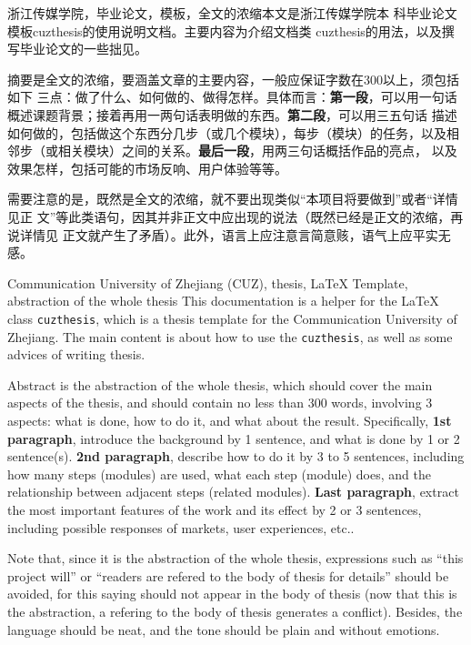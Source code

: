 \begin{chineseabstract}
    {浙江传媒学院，毕业论文，模板，全文的浓缩}本文是浙江传媒学院本
    科毕业论文模板cuzthesis的使用说明文档。主要内容为介绍文档类
    cuzthesis的用法，以及撰写毕业论文的一些拙见。

    摘要是全文的浓缩，要涵盖文章的主要内容，一般应保证字数在300以上，须包括如下
    三点：做了什么、如何做的、做得怎样。具体而言：\textbf{第一段}，可以用一句话
    概述课题背景；接着再用一两句话表明做的东西。\textbf{第二段}，可以用三五句话
    描述如何做的，包括做这个东西分几步（或几个模块），每步（模块）的任务，以及相
    邻步（或相关模块）之间的关系。\textbf{最后一段}，用两三句话概括作品的亮点，
    以及效果怎样，包括可能的市场反响、用户体验等等。
    
    需要注意的是，既然是全文的浓缩，就不要出现类似“本项目将要做到”或者“详情见正
    文”等此类语句，因其并非正文中应出现的说法（既然已经是正文的浓缩，再说详情见
    正文就产生了矛盾）。此外，语言上应注意言简意赅，语气上应平实无感。
\end{chineseabstract}
\begin{englishabstract}
    {Communication University of Zhejiang (CUZ), thesis, \LaTeX{} Template,
    abstraction of the whole thesis} This documentation is a helper for the
    \LaTeX{} class \texttt{cuzthesis}, which is a thesis template for the
    Communication University of Zhejiang. The main content is about how to use
    the \texttt{cuzthesis}, as well as some advices of writing thesis.

    Abstract is the abstraction of the whole thesis, which should cover the main
    aspects of the thesis, and should contain no less than 300 words, involving
    3 aspects: what is done, how to do it, and what about the result.
    Specifically, \textbf{1st paragraph}, introduce the background by 1
    sentence, and what is done by 1 or 2 sentence(s). \textbf{2nd paragraph},
    describe how to do it by 3 to 5 sentences, including how many steps
    (modules) are used, what each step (module) does, and the relationship
    between adjacent steps (related modules). \textbf{Last paragraph}, extract
    the most important features of the work and its effect by 2 or 3 sentences,
    including possible responses of markets, user experiences, etc..
	
	Note that, since it is the abstraction of the whole thesis, expressions such
	as ``this project will'' or ``readers are refered to the body of thesis for
	details'' should be avoided, for this saying should not appear in the body
	of thesis (now that this is the abstraction, a refering to the body of
	thesis generates a conflict). Besides, the language should be neat, and the
	tone should be plain and without emotions.
\end{englishabstract}